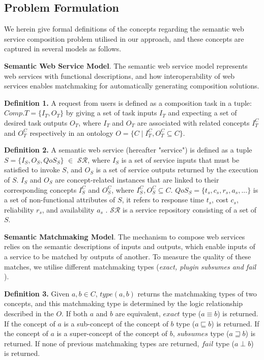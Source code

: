 \documentclass{llncs}
\begin{document}
\subsection{Problem Formulation}\label{problemDes}

We herein give formal definitions of the concepts regarding the semantic web service composition problem utilised in our approach, and these concepts are captured in several models as follows.

\textbf{Semantic Web Service Model}. The semantic web service model represents web services with functional descriptions, and how interoperability of web services enables matchmaking for automatically generating composition solutions.

\textbf{Definition 1.} A request from users is defined as a composition task in a tuple: $Comp.T = \{I_{T}, O_{T}\}$ by giving a set of task inputs $I_{T}$ and expecting  a set of desired task outputs $O_{T}$, where $I_{T}$ and $O_{T}$ are associated with related concepts $I^{C}_{T}$ and $O^{C}_{T}$ respectively in an ontology $O = \{ C \mid I^{C}_{T}, O^{C}_{T}  \subseteq C \}$.

\textbf{Definition 2.} A semantic web service (hereafter "service") is defined as a tuple $S = \{ I_{S}, O_{S}, QoS_S \}$ $\in$ $\mathcal{SR}$, where $I_{S}$ is a set of service inputs that must be satisfied to invoke $S$, and $O_{S}$ is a set of service outputs returned by the execution of $S$. $I_{S}$ and $O_{S}$ are concept-related instances that are linked to their corresponding concepts $I^{C}_{S}$ and $O^{C}_{S}$, where $ I^{C}_{S}, O^{C}_{S}  \subseteq C$. $QoS_S = \{ t_s, c_s, r_s, a_s, ... \} $ is a set of non-functional attributes of $S$, it refers to response time $t_s$, cost $c_s$, reliability $r_s$, and availability $a_s$ \cite{zeng2003quality}. $\mathcal{SR}$ is a service repository consisting of a set of $S$.
\vspace{0.3cm}

\textbf{Semantic Matchmaking Model}. The mechanism to compose web services relies on the semantic descriptions of inputs and outputs, which enable inputs of a service to be matched by outputs of another. To measure the quality of these matches, we utilise different matchmaking types (\textit{exact, plugin subsumes and fail} \cite{paolucci2002semantic} ).

\textbf{Definition 3.} Given $a, b \in C$, $type(a, b)$ returns the matchmaking types of two concepts, and this matchmaking type is determined by the logic relationship described in the $O$. If both $a$ and $b$ are equivalent, $exact$ type ($a \equiv b$) is returned. If the concept of $a$ is a sub-concept of the concept of $b$ type ($a \sqsubseteq b$) is returned. If the concept of $a$ is a super-concept of the concept of $b$, $subsumes$ type ($a \sqsupseteq b$) is returned. If none of previous matchmaking types are returned, $fail$ type ($a \perp b$) is returned.
\end{document}
